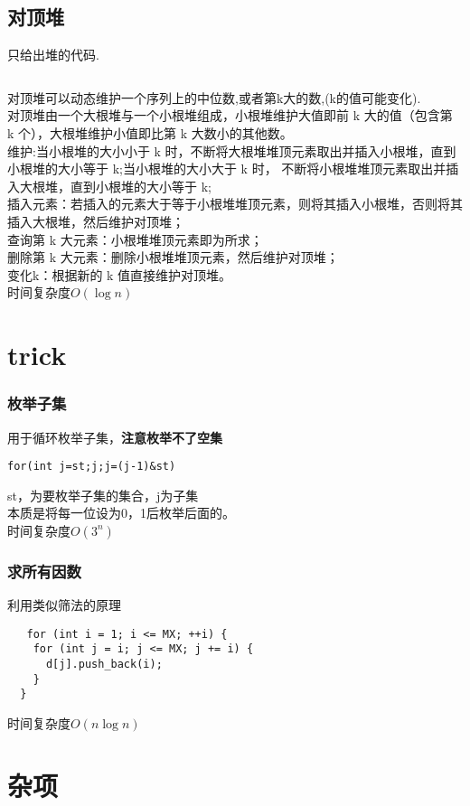 \documentclass[a4paper]{report}
\newcommand{\cppcode}[1]{  
    \inputminted[mathescape]{cpp}{source/#1}  
}
\begin{document}
\section{对顶堆}
只给出堆的代码.
\cppcode{Maxheap.cpp}
对顶堆可以动态维护一个序列上的中位数,或者第k大的数,(k的值可能变化).\\
对顶堆由一个大根堆与一个小根堆组成，小根堆维护大值即前 k 大的值（包含第 k 个），大根堆维护小值即比第 k 大数小的其他数。\\
维护:当小根堆的大小小于 k 时，不断将大根堆堆顶元素取出并插入小根堆，直到小根堆的大小等于 k;当小根堆的大小大于 k 时，
不断将小根堆堆顶元素取出并插入大根堆，直到小根堆的大小等于 k;\\
插入元素：若插入的元素大于等于小根堆堆顶元素，则将其插入小根堆，否则将其插入大根堆，然后维护对顶堆；\\
查询第 k 大元素：小根堆堆顶元素即为所求；\\
删除第 k 大元素：删除小根堆堆顶元素，然后维护对顶堆；\\
变化k：根据新的 k 值直接维护对顶堆。\\
时间复杂度$O(\log{n})$

\chapter{trick}

\subsection{枚举子集}

用于循环枚举子集，\textbf{注意枚举不了空集}
\begin{verbatim}  
for(int j=st;j;j=(j-1)&st) 
\end{verbatim}
st，为要枚举子集的集合，j为子集\\
本质是将每一位设为0，1后枚举后面的。\\
时间复杂度$O(3^n)$
\subsection{求所有因数}
利用类似筛法的原理\\
\begin{verbatim}  
   for (int i = 1; i <= MX; ++i) {
    for (int j = i; j <= MX; j += i) {
      d[j].push_back(i);
    }
  }
\end{verbatim}
时间复杂度$O(n\log{n})$
\chapter{杂项}
\end{document}
